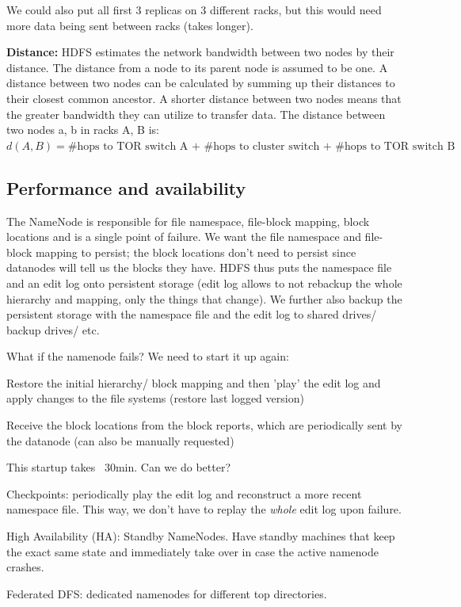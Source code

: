 \documentclass[11pt,oneside,a4paper]{article}
\begin{document}
We could also put all first 3 replicas on 3 different racks, but this would need more data being sent between racks (takes longer).

\textbf{Distance:} HDFS estimates the network bandwidth between two nodes by their distance. The distance from a node to its parent node is assumed to be one. A distance between two nodes can be calculated by summing up their distances to their closest common ancestor. A shorter distance between two nodes means that the greater bandwidth they can utilize to transfer data. The distance between two nodes a, b in racks A, B is:\\
$d(A,B) = \text{\#hops to TOR switch A + \#hops to cluster switch + \#hops to TOR switch B + \#hops to node b}$\\

\subsection{Performance and availability}

The NameNode is responsible for file namespace, file-block mapping, block locations and is a single point of failure. We want the file namespace and file-block mapping to persist; the block locations don't need to persist since datanodes will tell us the blocks they have. HDFS thus puts the namespace file and an edit log onto persistent storage (edit log allows to not rebackup the whole hierarchy and mapping, only the things that change). We further also backup the persistent storage with the namespace file and the edit log to shared drives/ backup drives/ etc.

What if the namenode fails? We need to start it up again:

\begin{compactitem}
	\item Restore the initial hierarchy/ block mapping and then 'play' the edit log and apply changes to the file systems (restore last logged version)
	\item Receive the block locations from the block reports, which are periodically sent by the datanode (can also be manually requested)
\end{compactitem}

This startup takes ~30min. Can we do better?

\begin{compactitem}
	\item Checkpoints: periodically play the edit log and reconstruct a more recent namespace file. This way, we don't have to replay the \textit{whole} edit log upon failure.
	\item High Availability (HA): Standby NameNodes. Have standby machines that keep the exact same state and immediately take over in case the active namenode crashes.
	\item Federated DFS: dedicated namenodes for different top directories.
\end{compactitem}
\end{document}
